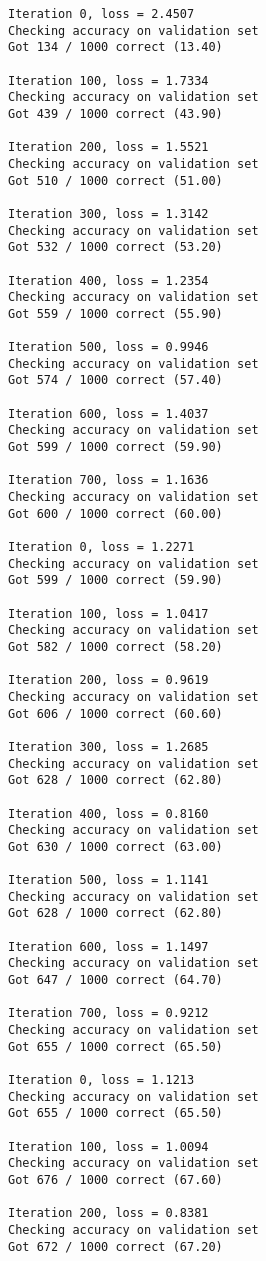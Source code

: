 \documentclass[11pt]{article}
\begin{document}
    \begin{Verbatim}[commandchars=\\\{\}]
Iteration 0, loss = 2.4507
Checking accuracy on validation set
Got 134 / 1000 correct (13.40)

Iteration 100, loss = 1.7334
Checking accuracy on validation set
Got 439 / 1000 correct (43.90)

Iteration 200, loss = 1.5521
Checking accuracy on validation set
Got 510 / 1000 correct (51.00)

Iteration 300, loss = 1.3142
Checking accuracy on validation set
Got 532 / 1000 correct (53.20)

Iteration 400, loss = 1.2354
Checking accuracy on validation set
Got 559 / 1000 correct (55.90)

Iteration 500, loss = 0.9946
Checking accuracy on validation set
Got 574 / 1000 correct (57.40)

Iteration 600, loss = 1.4037
Checking accuracy on validation set
Got 599 / 1000 correct (59.90)

Iteration 700, loss = 1.1636
Checking accuracy on validation set
Got 600 / 1000 correct (60.00)

Iteration 0, loss = 1.2271
Checking accuracy on validation set
Got 599 / 1000 correct (59.90)

Iteration 100, loss = 1.0417
Checking accuracy on validation set
Got 582 / 1000 correct (58.20)

Iteration 200, loss = 0.9619
Checking accuracy on validation set
Got 606 / 1000 correct (60.60)

Iteration 300, loss = 1.2685
Checking accuracy on validation set
Got 628 / 1000 correct (62.80)

Iteration 400, loss = 0.8160
Checking accuracy on validation set
Got 630 / 1000 correct (63.00)

Iteration 500, loss = 1.1141
Checking accuracy on validation set
Got 628 / 1000 correct (62.80)

Iteration 600, loss = 1.1497
Checking accuracy on validation set
Got 647 / 1000 correct (64.70)

Iteration 700, loss = 0.9212
Checking accuracy on validation set
Got 655 / 1000 correct (65.50)

Iteration 0, loss = 1.1213
Checking accuracy on validation set
Got 655 / 1000 correct (65.50)

Iteration 100, loss = 1.0094
Checking accuracy on validation set
Got 676 / 1000 correct (67.60)

Iteration 200, loss = 0.8381
Checking accuracy on validation set
Got 672 / 1000 correct (67.20)


\end{Verbatim}
\end{document}

